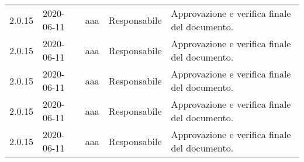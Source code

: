 {\begin{longtable}{c C{3.5cm} c C{3.5cm} C{3.5cm}}
2.0.15 & 2020-06-11 & aaa & Responsabile & Approvazione e verifica finale del documento. \\
2.0.15 & 2020-06-11 & aaa & Responsabile & Approvazione e verifica finale del documento. \\
2.0.15 & 2020-06-11 & aaa & Responsabile & Approvazione e verifica finale del documento. \\
2.0.15 & 2020-06-11 & aaa & Responsabile & Approvazione e verifica finale del documento. \\
2.0.15 & 2020-06-11 & aaa & Responsabile & Approvazione e verifica finale del documento. \\
		
		
\end{longtable}
}